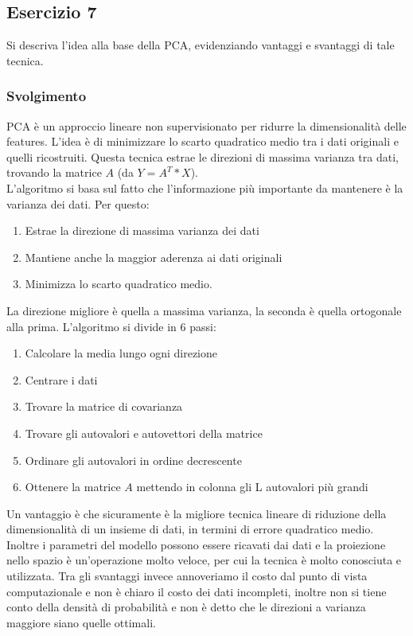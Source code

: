 \documentclass{article}
\begin{document}
\subsection*{Esercizio 7}
Si descriva l'idea alla base della PCA, evidenziando vantaggi e svantaggi di tale tecnica.
\subsubsection*{Svolgimento}
PCA è un approccio lineare non supervisionato per ridurre la dimensionalità
delle features. L'idea è di minimizzare lo scarto quadratico medio tra i dati originali e quelli ricostruiti. Questa tecnica estrae le direzioni di massima varianza
tra dati, trovando la matrice $A$ (da $Y = A^T * X$).\\
L'algoritmo si basa sul fatto che l'informazione più importante da mantenere è la varianza dei dati. Per questo:
\begin{enumerate}
    \item Estrae la direzione di massima varianza dei dati
    \item Mantiene anche la maggior aderenza ai dati originali
    \item Minimizza lo scarto quadratico medio.
\end{enumerate}
La direzione migliore è quella a massima varianza, la seconda è quella ortogonale alla prima.
L'algoritmo si divide in 6 passi:
\begin{enumerate}
    \item Calcolare la media lungo ogni direzione
    \item Centrare i dati
    \item Trovare la matrice di covarianza
    \item Trovare gli autovalori e autovettori della matrice 
    \item Ordinare gli autovalori in ordine decrescente
    \item Ottenere la matrice $A$ mettendo in colonna gli L autovalori più grandi
\end{enumerate}
Un vantaggio è che sicuramente è la migliore tecnica lineare di riduzione della dimensionalità di un insieme di dati, in termini di errore quadratico medio. Inoltre i parametri del modello possono essere ricavati dai dati e la proiezione nello spazio è un'operazione molto veloce, per cui la tecnica è molto conosciuta e utilizzata. Tra gli svantaggi invece annoveriamo il costo dal punto di vista computazionale e non è chiaro il costo dei dati incompleti, inoltre non si tiene conto della densità di probabilità e non è detto che le direzioni a varianza maggiore siano quelle ottimali.
\end{document}
